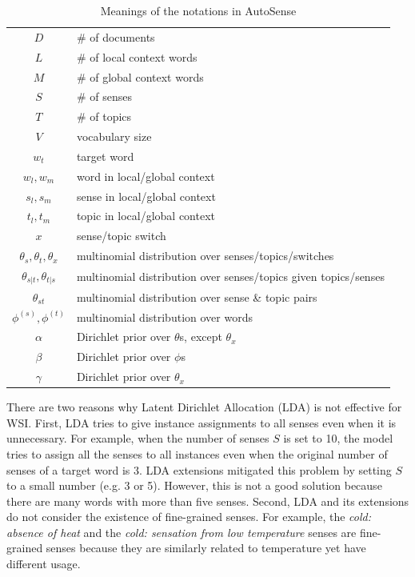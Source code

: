\documentclass[letterpaper]{article}
\begin{document}
\begin{table}[t]
    \scriptsize
    \centering
    \begin{tabularx}{0.47\textwidth}{|cX|}
        \hline
        $D$ & \# of documents \\
        $L$ & \# of local context words \\
        $M$ & \# of global context words \\
        $S$ & \# of senses \\
        $T$ & \# of topics \\
        $V$ & vocabulary size \\
        $w_t$ & target word \\
        $w_l,w_m$ & word in local/global context \\
        $s_l,s_m$ & sense in local/global context \\
        $t_l,t_m$ & topic in local/global context \\
        $x$ & sense/topic switch \\
        $\theta_s,\theta_t,\theta_{x}$ & multinomial distribution over senses/topics/switches \\
        $\theta_{s|t},\theta_{t|s}$ & multinomial distribution over senses/topics given topics/senses \\
        $\theta_{st}$ & multinomial distribution over sense \& topic pairs \\
        $\phi^{(s)},\phi^{(t)}$ & multinomial distribution over words \\
        $\alpha$ & Dirichlet prior over $\theta$s, except $\theta_{x}$ \\
        $\beta$ & Dirichlet prior over $\phi$s \\
        $\gamma$ & Dirichlet prior over $\theta_{x}$ \\
        \hline
    \end{tabularx}
    \caption{Meanings of the notations in AutoSense}
    \label{tab:notations}
\end{table}

There are two reasons why Latent Dirichlet Allocation (LDA) \cite{blei2003latent} is not effective for WSI. First, LDA tries to give instance assignments to all senses even when it is unnecessary. For example, when the number of senses $S$ is set to 10, the model tries to assign all the senses to all instances even when the original number of senses of a target word is 3. LDA extensions \cite{wang2015sense,chang2014inducing} mitigated this problem by setting $S$ to a small number (e.g. 3 or 5). However, this is not a good solution because there are many words with more than five senses. Second, LDA and its extensions do not consider the existence of fine-grained senses. For example, the \textit{cold: absence of heat} and the \textit{cold: sensation from low temperature} senses are fine-grained senses because they are similarly related to temperature yet have different usage. %
\end{document}
